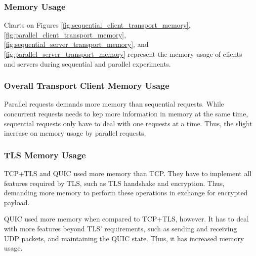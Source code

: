 \subsubsection{Memory Usage}

Charts on Figures \ref{fig:sequential_client_transport_memory}, \ref{fig:parallel_client_transport_memory}, \ref{fig:sequential_server_transport_memory}, and \ref{fig:parallel_server_transport_memory} represent the memory usage of clients and servers during sequential and parallel experiments.

\subsubsection*{Overall Transport Client Memory Usage}

Parallel requests demands more memory than sequential requests. While concurrent requests needs to kep more information in memory at the same time, sequential requests only have to deal with one requests at a time. Thus, the slight increase on memory usage by parallel requests.

\subsubsection*{TLS Memory Usage}

TCP+TLS and QUIC used more memory than TCP. They have to implement all features required by TLS, such as TLS handshake and encryption. Thus, demanding more memory to perform these operations in exchange for encrypted payload.

QUIC used more memory when compared to TCP+TLS, however. It has to deal with more features beyond TLS' requirements, such as sending and receiving UDP packets, and maintaining the QUIC state. Thus, it has increased memory usage.

\clearpage

